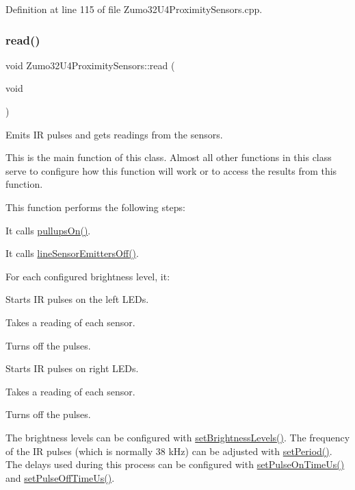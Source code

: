 Definition at line 115 of file Zumo32\+U4\+Proximity\+Sensors.\+cpp.

\mbox{\label{class_zumo32_u4_proximity_sensors_a071d935e10e2a16a3ae2559d16a12683}} 
\subsubsection{\texorpdfstring{read()}{read()}}
{\footnotesize\ttfamily void Zumo32\+U4\+Proximity\+Sensors\+::read (\begin{DoxyParamCaption}\item[{void}]{ }\end{DoxyParamCaption})}



Emits IR pulses and gets readings from the sensors. 

This is the main function of this class. Almost all other functions in this class serve to configure how this function will work or to access the results from this function.

This function performs the following steps\+:


\begin{DoxyEnumerate}
\item It calls \hyperlink{class_zumo32_u4_proximity_sensors_ae596289faf5921bc7c199cf73edf534e}{pullups\+On()}.
\item It calls \hyperlink{class_zumo32_u4_proximity_sensors_a583dada6ad676cbda2ec7d55b05338b8}{line\+Sensor\+Emitters\+Off()}.
\item For each configured brightness level, it\+:
\begin{DoxyEnumerate}
\item Starts IR pulses on the left L\+E\+Ds.
\item Takes a reading of each sensor.
\item Turns off the pulses.
\item Starts IR pulses on right L\+E\+Ds.
\item Takes a reading of each sensor.
\item Turns off the pulses.
\end{DoxyEnumerate}
\end{DoxyEnumerate}

The brightness levels can be configured with \hyperlink{class_zumo32_u4_proximity_sensors_a47820baf67dfa58dedb41cb7bb26dc65}{set\+Brightness\+Levels()}. The frequency of the IR pulses (which is normally 38 k\+Hz) can be adjusted with \hyperlink{class_zumo32_u4_proximity_sensors_ab288aeae9bcc5933cede8941b709b4fc}{set\+Period()}. The delays used during this process can be configured with \hyperlink{class_zumo32_u4_proximity_sensors_aeb626f226420976e774d93dd2a83e768}{set\+Pulse\+On\+Time\+Us()} and \hyperlink{class_zumo32_u4_proximity_sensors_a4d7911aca58734a76be212de103a1387}{set\+Pulse\+Off\+Time\+Us()}.

